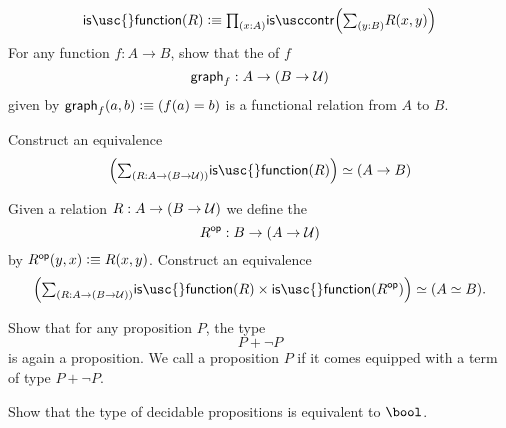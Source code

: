 \begin{exercises}
\begin{subexenum}
\begin{equation*}
\mathsf{is\usc{}function}(R) \defeq \prd{x:A}\iscontr\Big(\sm{y:B}R(x,y)\Big)
\end{equation*}
For any function $f:A\to B$, show that the  of $f$ 
\begin{equation*}
\mathsf{graph}_f:A\to (B\to \mathcal{U})
\end{equation*}
given by $\mathsf{graph}_f(a,b)\vcentcolon\equiv (f(a)=b)$ is a functional relation from $A$ to $B$.
\item Construct an equivalence
\begin{equation*}
\eqv{\Big(\sm{R:A\to (B\to\UU)}\mathsf{is\usc{}function}(R)\Big)}{(A\to B)}
\end{equation*}
\item Given a relation $R:A\to (B\to \mathcal{U})$ we define the 
\begin{equation*}
R^{\mathsf{op}} : B\to (A\to\mathcal{U})
\end{equation*}
by $R^{\mathsf{op}}(y,x)\vcentcolon\equiv R(x,y)$. Construct an equivalence
\begin{equation*}
\eqv{\Big(\sm{R:A\to (B\to \UU)}\mathsf{is\usc{}function}(R)\times\mathsf{is\usc{}function}(R^{\mathsf{op}})\Big)}{(\eqv{A}{B})}.
\end{equation*}
\end{subexenum}
\item
  \begin{subexenum}
  \item Show that for any proposition $P$, the type
    \begin{equation*}
      P+\neg P
    \end{equation*}
    is again a proposition. We call a proposition $P$  if it comes equipped with a term of type $P+\neg P$.
  \item Show that the type of decidable propositions is equivalent to $\bool$.
  \end{subexenum}
\end{exercises}

